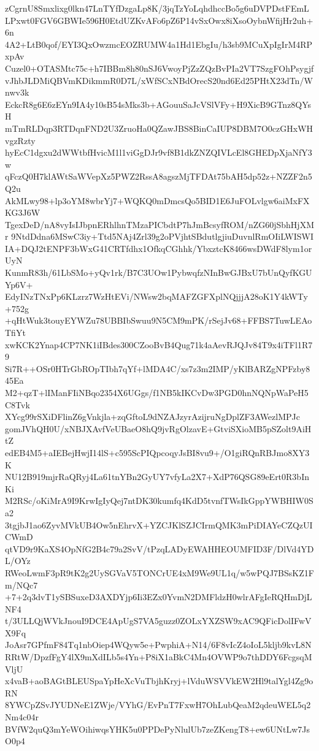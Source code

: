 zCgrnU8Smxlixg0lkn47LnTYfDzgaLp8K/3jqTzYoLqhdhccBo5g6uDVPDstFEmL
LPxwt0FGV6GBWIe596H0EtdUZKvAFo6pZ6P14vSxOwx8iXsoOybnWfijHr2uh+6n
4A2+LtB0qof/EYI3QxOwzmcEOZRUMW4a1Hd1EbgIu/h3sb9MCuXpIgIrM4RPxpAv
Cuzel0+OTASMtc75c+h7IBBm8h80nSJ6VwoyPjZzZQzBvPIa2VT7SzgFOhPsygjf
vJhbJLDMiQBVmKDikmmR0D7L/xWfSCxNBdOrecS20nd6Ed25PHtX23dTn/Wnwv3k
EckcR8g6E6zEYn9IA4y10sB54sMks3b+AGouuSaJcVSlVFy+H9XicB9GTnz8QYsH
mTmRLDqp3RTDqnFND2U3ZruoHa0QZawJBS8BinCaIUP8DBM7O0czGHxWHvgzRzty
hyEcC1dgxu2dWWtbfHvicM1l1viGgDJr9vf8B1dkZNZQIVLcEl8GHEDpXjaNfY3w
qFczQ0H7klAWtSaWVepXz5PWZ2RssA8agszMjTFDAt75bAH5dp52z+NZZF2n5Q2u
AkMLwy98+lp3oYM8wbrYj7+WQKQ0mDmcsQo5BID1E6JuFOLvlgw6aiMxFXKG3J6W
TgexDeD/nA8vyIsIJbpnERhlhnTMzaPICbdtP7hJmBcsyfROM/nZG60jSbhHjXMr
9NtdDdna6MSwC3iy+Ttd5NAj4Zrl39g2oPVjhtSBdutlgjiuDuvnlRmOIiLWISWI
IA+DQJ2tENPF3bWxG41CRTfdhx1OfkqCGhhk/YbxztcK8466wsDWdF8lym1orUyN
KunmR83h/61LbSMo+yQv1rk/B7C3UOw1PybwqfzNInBwGJBxU7bUnQyfKGUYp6V+
EdyINzTNxPp6KLzrz7WzHtEVi/NWsw2bqMAFZGFXplNQjjjA28oK1Y4kWTy+752g
+qHtWuk3touyEYWZu78UBBIbSwuu9N5CM9mPK/rSejJv68+FFBS7TuwLEAoTfiYt
xwKCK2Ynap4CP7NK1iIBdes300CZooBvB4Qug71k4aAevRJQJv84T9x4iTFl1R79
Si7R++OSr0HTrGbROpTIbh7qYf+lMDA4C/xs7z3m2IMP/yKlBARZgNPFzby845Ea
M2+qzT+lIManFIiNBqo2354X6UGgs/f1NB5kIKCvDw3PGD0hnNQNpWaPeH5C8Tvk
XYcg99rSXiDFlinZ6gVnkjla+zqGftoL9dNZAJzyrAzijruNgDplZF3AWezlMPJc
gomJVhQH0U/xNBJXAvfVeUBaeO8hQ9jvRgOlzavE+GtviSXioMB5pSZolt9AiHtZ
edEB4M5+aIEBejHwjI14lS+c595ScPIQpcoqyJsBI8vu9+/O1giRQnRBJmo8XY3K
NU12B919mjrRaQRyj4La61tnYBn2GyUY7vfyLa2X7+XdP76QSG89eErt0R3bInKi
M2RSc/oKiMrA9I9KrwIgIyQej7ntDK30kumfq4KdD5tvnfTWsIkGppYWBHIW0Sa2
3tgjbJ1ao6ZyvMVkUB4Ow5nEhrvX+YZCJKlSZJCIrmQMK3mPiDIAYeCZQzUICWmD
qtVD9r9KaXS4OpNfG2B4c79a2SvV/tPzqLADyEWAHHEOUMFID3F/DlVd4YDL/OYz
RWeoLwmF3pR9tK2g2UySGVaV5TONCrUE4xM9We9UL1q/w5wPQJ7BSsKZ1Fm/NQc7
+7+2q3dvT1ySBSuxeD3AXDYjp6Ii3EZx0YvmN2DMFldzH0wlrAFgIeRQHmDjLNF4
t/3ULLQjWVkJnouI9DCE4ApUgS7VA5guzz0ZOLxYXZSW9xAC9QFicDolIFwVX9Fq
JoAsr7GPfmF84Tq1nbOiep4WQyw5e+PwphiA+N14/6F8vIcZ4oIoL5kljb9kvL8N
RRtW/DpzfFgY4lX9mXdILb5s4Yn+P8iX1aBkC4Mn4OVWP9o7thDDY6FcgsqMVljU
x4vaB+aoBAGtBLEUSpaYpHeXcVuTbjhKryj+lVduWSVVkEW2Hl9talYgl4Zg9oRN
8YWCpZSvJYUDNeE1ZWje/VYhG/EvPnT7FxwH7OhLubQeaM2qdeuWEL5q2Nm4c04r
BVfW2quQ3mYeWOihiwqsYHK5u0PPDePyNlulUb7zeZKengT8+ew6UNtLw7JsO0p4
